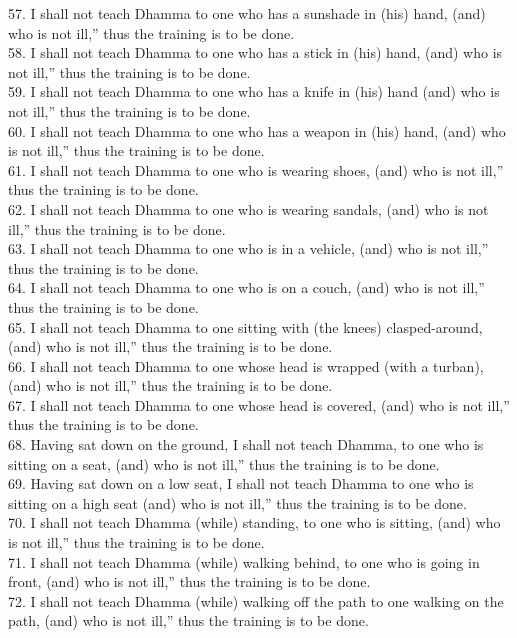 \documentclass[12pt]{article}
\begin{document}
\begin{paracol}{2}
\begin{column}
{\begin{doublespace}
57. I shall not teach Dhamma to one who has a sunshade in (his) hand, (and) who is not ill,” thus the training is to be done.\\
58. I shall not teach Dhamma to one who has a stick in (his) hand, (and) who is not ill,” thus the training is to be done.\\
59. I shall not teach Dhamma to one who has a knife in (his) hand (and) who is not ill,” thus the training is to be done.\\
60. I shall not teach Dhamma to one who has a weapon in (his) hand, (and) who is not ill,” thus the training is to be done.\\
61. I shall not teach Dhamma to one who is wearing shoes, (and) who is not ill,” thus the training is to be done.\\
62. I shall not teach Dhamma to one who is wearing sandals, (and) who is not ill,” thus the training is to be done.\\
63. I shall not teach Dhamma to one who is in a vehicle, (and) who is not ill,” thus the training is to be done.\\
64. I shall not teach Dhamma to one who is on a couch, (and) who is not ill,” thus the training is to be done.\\
65. I shall not teach Dhamma to one sitting with (the knees) clasped-around, (and) who is not ill,” thus the training is to be done.\\
66. I shall not teach Dhamma to one whose head is wrapped (with a turban), (and) who is not ill,” thus the
training is to be done.\\
67. I shall not teach Dhamma to one whose head is covered, (and) who is not ill,” thus the training is to be done.\\
68. Having sat down on the ground, I shall not teach Dhamma, to one who is sitting on a seat, (and) who is not ill,” thus the training is to be done.\\
69. Having sat down on a low seat, I shall not teach Dhamma to one who is sitting on a high seat (and) who is not ill,” thus the training is to be done.\\
70. I shall not teach Dhamma (while) standing, to one who is sitting, (and) who is not ill,” thus the training is to be done.\\
71. I shall not teach Dhamma (while) walking behind, to one who is going in front, (and) who is not ill,” thus the training is to be done.\\
72. I shall not teach Dhamma (while) walking off the path to one walking on the path, (and) who is not ill,” thus the training is to be done.\\
\end{doublespace}}


\end{column}
\end{paracol}
\end{document}
